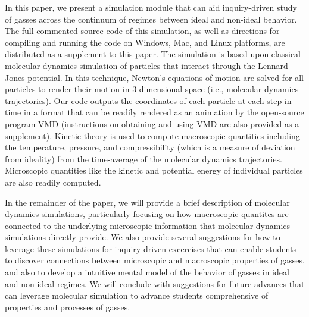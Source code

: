 \documentclass[journal=jpclcd,manuscript=article]{achemso}
\begin{document}
In this paper, we present a simulation module that can aid inquiry-driven study of gasses across
the continuum of regimes between ideal and non-ideal behavior.  The full commented source code of this simulation,
as well as directions for compiling and running the code on Windows, Mac, and Linux platforms, are distributed as a supplement
to this paper.  The simulation is based upon classical molecular dynamics
simulation of particles that interact through the Lennard-Jones potential.  In this technique, Newton's equations of motion 
are solved for all particles to render their motion in 3-dimensional space (i.e., molecular dynamics trajectories).  Our code outputs the coordinates
of each particle at each step in time in a format that can be readily rendered as an animation by the open-source program
VMD (instructions on obtaining and using VMD are also provided as a supplement).  Kinetic theory is used to
compute macroscopic quantities including the temperature, pressure, and compressibility (which is a measure
of deviation from ideality) from the time-average of the molecular dynamics trajectories.  Microscopic quantities like the kinetic
and potential energy of individual particles are also readily computed.  

In the remainder of the paper, we will provide a brief description of molecular dynamics simulations, particularly focusing on 
how macroscopic quantites are connected to the underlying microscopic information that molecular dynamics simulations directly provide.  We also provide 
several suggestions for how to leverage these simulations for inquiry-driven excercises that can enable students to discover
connections between microscopic and macroscopic properties of gasses, and also to develop a intuitive mental 
model of the behavior of gasses in ideal and non-ideal regimes.  We will conclude with suggestions for future advances
that can leverage molecular simulation to advance students comprehensive of properties and processes of gasses.  
\end{document}
